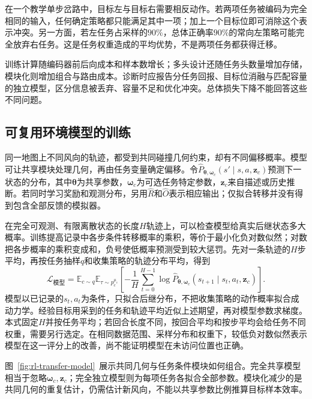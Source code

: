 在一个教学单步岔路中，目标左与目标右需要相反动作。若两项任务被编码为完全相同的输入，任何确定策略都只能满足其中一项；加上一个目标位即可消除这个表示冲突。另一方面，若左任务占采样的$90\%$，总体正确率$90\%$的常向左策略可能完全放弃右任务。这是任务权重造成的平均优势，不是两项任务都获得迁移。

训练计算随编码器前后向成本和样本数增长；多头设计还随任务头数量增加存储，模块化则增加组合与路由成本。诊断时应报告分任务回报、目标位消融与匹配容量的独立模型，区分信息被丢弃、容量不足和优化冲突。总体损失下降不能回答这些不同问题。

\subsection{可复用环境模型的训练}
\label{sec:rl-transfer-model-training}

同一地图上不同风向的轨迹，都受到共同碰撞几何约束，却有不同偏移概率。模型可让共享模块处理几何，再由任务变量确定偏移。令$\widehat P_{\bm\theta,\bm\omega_c}(s'\mid s,a,\bm z_c)$预测下一状态的分布，其中$\bm\theta$为共享参数，$\bm\omega_c$为可选任务特定参数，$\bm z_c$来自描述或历史推断。若同时学习奖励和观测分布，另用$\widehat R$和$\widehat O$表示相应输出；仅拟合转移并没有得到包含全部反馈的模拟器。

在完全可观测、有限离散状态的长度$H$轨迹上，可以检查模型给真实后继状态多大概率。训练提高记录中各步条件转移概率的乘积，等价于最小化负对数似然；对数把各步概率的乘积变成和，负号使低概率预测受到较大惩罚。先对一条轨迹的$H$步平均，再按任务抽样$q$和收集策略的轨迹分布平均，得到
\begin{equation}
 \mathcal L_{\text{模型}}
 =\mathbb E_{c\sim q}\mathbb E_{\tau\sim p_c^{\mu_c}}
 \left[-\frac1H\sum_{t=0}^{H-1}
 \log\widehat P_{\bm\theta,\bm\omega_c}
 (s_{t+1}\mid s_t,a_t,\bm z_c)\right].
 \label{eq:rl-transfer-model-loss}
\end{equation}
模型以已记录的$s_t,a_t$为条件，只拟合后继分布，不把收集策略的动作概率拟合成动力学。经验目标用采到的任务和轨迹平均近似上述期望，再对模型参数求梯度。本式固定$H$并按任务平均；若回合长度不同，按回合平均和按步平均会给任务不同权重，需要另行选定。在相同数据范围、采样分布和权重下，较低负对数似然表示模型在这一评分上的改善，尚不能证明模型在未访问位置也正确。

图~\ref{fig:rl-transfer-model}~展示共同几何与任务条件模块如何组合。完全共享模型相当于忽略$\bm\omega_c,\bm z_c$；完全独立模型则为每项任务各拟合全部参数。模块化减少的是共同几何的重复估计，仍需估计新风向，不能以共享参数比例推算目标样本效率。

